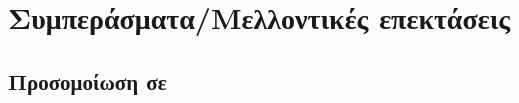 \chapter{Συμπεράσματα/Μελλοντικές επεκτάσεις}
\en{\lipsum[1]}
\section{Προσομοίωση σε }
\en{\lipsum[1]}
